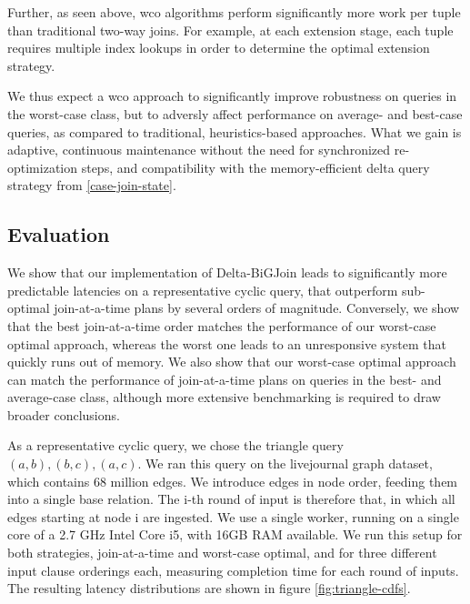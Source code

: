 \documentclass[../catalog.tex]{subfiles}
\begin{document}
Further, as seen above, wco algorithms perform significantly more work
per tuple than traditional two-way joins. For example, at each
extension stage, each tuple requires multiple index lookups in order
to determine the optimal extension strategy.

We thus expect a wco approach to significantly improve robustness on
queries in the worst-case class, but to adversly affect performance on
average- and best-case queries, as compared to traditional,
heuristics-based approaches. What we gain is adaptive, continuous
maintenance without the need for synchronized re-optimization steps,
and compatibility with the memory-efficient delta query strategy from
\autoref{case-join-state}.

\subsection{Evaluation}

We show that our implementation of Delta-BiGJoin leads to
significantly more predictable latencies on a representative cyclic
query, that outperform sub-optimal join-at-a-time plans by several
orders of magnitude. Conversely, we show that the best join-at-a-time
order matches the performance of our worst-case optimal approach,
whereas the worst one leads to an unresponsive system that quickly
runs out of memory. We also show that our worst-case optimal approach
can match the performance of join-at-a-time plans on queries in the
best- and average-case class, although more extensive benchmarking is
required to draw broader conclusions.

As a representative cyclic query, we chose the triangle query $(a,b),
(b,c), (a,c)$. We ran this query on the livejournal graph dataset,
which contains 68 million edges. We introduce edges in node order,
feeding them into a single base relation. The i-th round of input is
therefore that, in which all edges starting at node i are ingested. We
use a single worker, running on a single core of a 2.7 GHz Intel Core
i5, with 16GB RAM available. We run this setup for both strategies,
join-at-a-time and worst-case optimal, and for three different input
clause orderings each, measuring completion time for each round of
inputs. The resulting latency distributions are shown in figure
\ref{fig:triangle-cdfs}.
\end{document}
